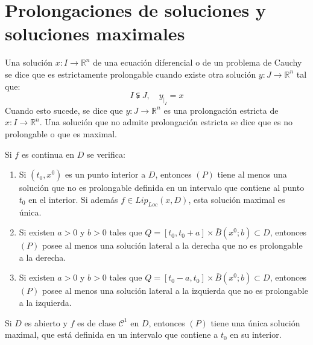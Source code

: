\chapter{Prolongaciones de soluciones y soluciones maximales}
\begin{definition}
    Una solución $x: I \to \mathbb{R}^n$ de una ecuación diferencial o de un problema de Cauchy se dice que es estrictamente prolongable cuando existe otra solución $y: J \to \mathbb{R}^n$ tal que:
    $$I \subsetneqq J, \quad y_{|_I} = x$$
    Cuando esto sucede, se dice que $y: J \to \mathbb{R}^n$ es una prolongación estricta de $x: I \to \mathbb{R}^n$.
    Una solución que no admite prolongación estricta se dice que es no prolongable o que es maximal.
\end{definition}

\begin{theorem}
    Si $f$ es continua en $D$ se verifica:
    \begin{enumerate}
        \item Si $(t_0, x^0)$ es un punto interior a $D$, entonces $(P)$ tiene al menos una solución que no es prolongable definida en un intervalo que contiene al punto $t_0$ en el interior.
              Si además $f \in Lip_{Loc}(x, D)$, esta solución maximal es única.
        \item Si existen $a > 0$ y $b > 0$ tales que $Q = [t_0, t_0 + a] \times \bar{B}(x^0; b) \subset D$, entonces $(P)$ posee al menos una solución lateral a la derecha que no es prolongable a la derecha.
        \item Si existen $a > 0$ y $b > 0$ tales que $Q = [t_0 - a, t_0] \times \bar{B}(x^0; b) \subset D$, entonces $(P)$ posee al menos una solución lateral a la izquierda que no es prolongable a la izquierda.
    \end{enumerate}
\end{theorem}

\begin{remark}
    Si $D$ es abierto y $f$ es de clase $\mathcal{C}^1$ en $D$, entonces $(P)$ tiene una única solución maximal, que está definida en un intervalo que contiene a $t_0$ en su interior.
\end{remark}

